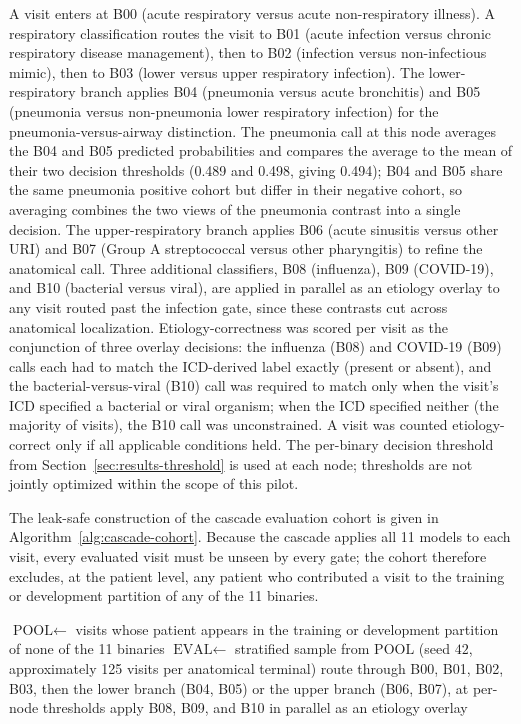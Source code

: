 \documentclass[utf8]{FrontiersinHarvard} %
\begin{document}
A visit enters at B00 (acute respiratory versus acute non-respiratory illness). A respiratory classification routes the visit to B01 (acute infection versus chronic respiratory disease management), then to B02 (infection versus non-infectious mimic), then to B03 (lower versus upper respiratory infection). The lower-respiratory branch applies B04 (pneumonia versus acute bronchitis) and B05 (pneumonia versus non-pneumonia lower respiratory infection) for the pneumonia-versus-airway distinction. The pneumonia call at this node averages the B04 and B05 predicted probabilities and compares the average to the mean of their two decision thresholds (0.489 and 0.498, giving 0.494); B04 and B05 share the same pneumonia positive cohort but differ in their negative cohort, so averaging combines the two views of the pneumonia contrast into a single decision. The upper-respiratory branch applies B06 (acute sinusitis versus other URI) and B07 (Group A streptococcal versus other pharyngitis) to refine the anatomical call. Three additional classifiers, B08 (influenza), B09 (COVID-19), and B10 (bacterial versus viral), are applied in parallel as an etiology overlay to any visit routed past the infection gate, since these contrasts cut across anatomical localization. Etiology-correctness was scored per visit as the conjunction of three overlay decisions: the influenza (B08) and COVID-19 (B09) calls each had to match the ICD-derived label exactly (present or absent), and the bacterial-versus-viral (B10) call was required to match only when the visit's ICD specified a bacterial or viral organism; when the ICD specified neither (the majority of visits), the B10 call was unconstrained. A visit was counted etiology-correct only if all applicable conditions held. The per-binary decision threshold from Section~\ref{sec:results-threshold} is used at each node; thresholds are not jointly optimized within the scope of this pilot.

The leak-safe construction of the cascade evaluation cohort is given in Algorithm~\ref{alg:cascade-cohort}. Because the cascade applies all 11 models to each visit, every evaluated visit must be unseen by every gate; the cohort therefore excludes, at the patient level, any patient who contributed a visit to the training or development partition of any of the 11 binaries.

\begin{algorithm}[htbp]
\caption{Leak-safe cascade evaluation cohort.}
\label{alg:cascade-cohort}
\begin{algorithmic}[1]
\State $\text{POOL} \gets$ visits whose patient appears in the training or development partition of none of the 11 binaries
\State $\text{EVAL} \gets$ stratified sample from $\text{POOL}$ (seed $42$, approximately 125 visits per anatomical terminal)
  \State route through B00, B01, B02, B03, then the lower branch (B04, B05) or the upper branch (B06, B07), at per-node thresholds
  \State apply B08, B09, and B10 in parallel as an etiology overlay
\EndFor
\end{algorithmic}
\end{algorithm}
\end{document}
